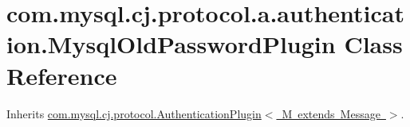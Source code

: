 \hypertarget{classcom_1_1mysql_1_1cj_1_1protocol_1_1a_1_1authentication_1_1_mysql_old_password_plugin}{}\section{com.\+mysql.\+cj.\+protocol.\+a.\+authentication.\+Mysql\+Old\+Password\+Plugin Class Reference}
\label{classcom_1_1mysql_1_1cj_1_1protocol_1_1a_1_1authentication_1_1_mysql_old_password_plugin}


Inherits \mbox{\hyperlink{interfacecom_1_1mysql_1_1cj_1_1protocol_1_1_authentication_plugin}{com.\+mysql.\+cj.\+protocol.\+Authentication\+Plugin$<$ M extends Message $>$}}.

